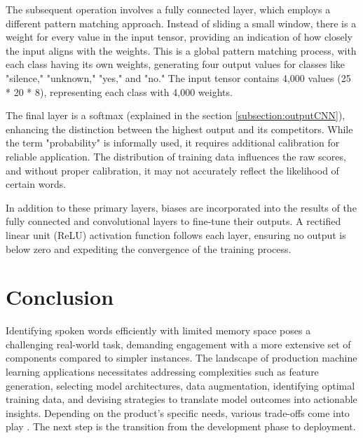 The subsequent operation involves a fully connected layer, which employs a different pattern matching approach. Instead of sliding a small window, there is a weight for every value in the input tensor, providing an indication of how closely the input aligns with the weights. This is a global pattern matching process, with each class having its own weights, generating four output values for classes like "silence," "unknown," "yes," and "no." The input tensor contains 4,000 values (25 * 20 * 8), representing each class with 4,000 weights.

The final layer is a softmax (explained in the section \ref{subsection:outputCNN}), enhancing the distinction between the highest output and its competitors. While the term "probability" is informally used, it requires additional calibration for reliable application. The distribution of training data influences the raw scores, and without proper calibration, it may not accurately reflect the likelihood of certain words.

In addition to these primary layers, biases are incorporated into the results of the fully connected and convolutional layers to fine-tune their outputs. A rectified linear unit (ReLU) activation function follows each layer, ensuring no output is below zero and expediting the convergence of the training process.


\section{Conclusion}

Identifying spoken words efficiently with limited memory space poses a challenging real-world task, demanding engagement with a more extensive set of components compared to simpler instances. The landscape of production machine learning applications necessitates addressing complexities such as feature generation, selecting model architectures, data augmentation, identifying optimal training data, and devising strategies to translate model outcomes into actionable insights. Depending on the product's specific needs, various trade-offs come into play \cite{Warden:2019}. The next step is the transition from the development phase to deployment.


